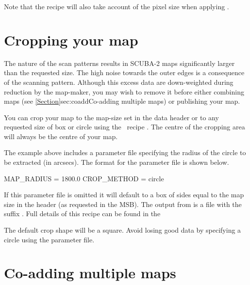 Note that the recipe will also take account of the pixel size when
applying \fcfa.

\section{Cropping your map}
\label{sec:crop}

The nature of the scan patterns results in SCUBA-2 maps significantly
larger than the requested size. The high noise towards the outer edges
is a consequence of the scanning pattern. Although this excess data
are down-weighted during reduction by the map-maker, you may wish to
remove it before either combining maps (see
\cref{Section}{sec:coadd}{Co-adding multiple maps}) or publishing your
map.

You can crop your map to the map-size set in the data header or to any
requested size of box or circle using the \picard\ recipe
.
The centre of the cropping area will always be the centre of your map.

\begin{terminalv}
\end{terminalv}

The example above includes a parameter file specifying the radius of
the circle to be extracted (in arcsecs).  The format for the parameter
file is shown below.

\begin{terminalv}
MAP_RADIUS = 1800.0
CROP_METHOD = circle
\end{terminalv}


If this parameter file is omitted it will default to a box of sides
equal to the map size in the header (as requested in the MSB). The
output from  is a file with the suffix
. Full details of this recipe can be found in the

\begin{tip}
  The default crop shape will be a square. Avoid losing good data by
  specifying a circle using the parameter file.
\end{tip}

\section{Co-adding multiple maps}
\label{sec:coadd}

